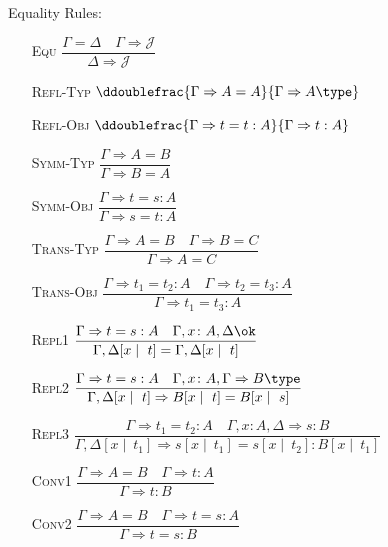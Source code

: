 Equality Rules:
\begin{enumerate}
    \item[\textsc{Equ}] $\dfrac{
        \Gamma = \Delta
        \quad
        \Gamma \Rightarrow \mathcal{J}
    }{
        \Delta \Rightarrow \mathcal{J}
    }$ 
    \item[\textsc{Refl-Typ}] $\ddoublefrac{
        \Gamma \Rightarrow A = A
    }{
        \Gamma \Rightarrow A \type
    }$
    \item[\textsc{Refl-Obj}] $\ddoublefrac{
        \Gamma \Rightarrow t = t : A
    }{
        \Gamma \Rightarrow t : A
    }$
    \item[\textsc{Symm-Typ}] $\dfrac{
        \Gamma \Rightarrow A = B
    }{
        \Gamma \Rightarrow B = A
    }$
    \item[\textsc{Symm-Obj}] $\dfrac{
        \Gamma \Rightarrow t = s : A
    }{
        \Gamma \Rightarrow s = t : A
    }$
    \item[\textsc{Trans-Typ}] $\dfrac{
        \Gamma \Rightarrow A = B 
        \quad
        \Gamma \Rightarrow B = C
    }{
        \Gamma \Rightarrow A = C
    }$
    \item[\textsc{Trans-Obj}] $\dfrac{
        \Gamma \Rightarrow t_1 = t_2 : A 
        \quad
        \Gamma \Rightarrow t_2 = t_3 : A
    }{
        \Gamma \Rightarrow t_1 = t_3 : A
    }$
    \item[\textsc{Repl1}] $\dfrac{
        \Gamma \Rightarrow t = s : A
        \quad
        \Gamma, x \colon A, \Delta \ok
    }{
        \Gamma, \Delta[x \mid\ t] 
        =
        \Gamma, \Delta[x \mid\ t]
    }$
    \item[\textsc{Repl2}] $\dfrac{
        \Gamma \Rightarrow t = s : A
        \quad
        \Gamma, x \colon A, \Gamma \Rightarrow B \type
    }{
        \Gamma, \Delta[x \mid\ t]
        \Rightarrow
        B[x \mid\ t] = B[x \mid\ s]
    }$
    \item[\textsc{Repl3}] $\dfrac{
        \Gamma \Rightarrow t_1 = t_2 : A
        \quad
        \Gamma, x \colon A, \Delta \Rightarrow s : B
    }{
        \Gamma, \Delta[ x \mid\ t_1]
        \Rightarrow
        s[x \mid\ t_1] = s[x \mid\ t_2] : B[x \mid\ t_1]
    }$
    \item[\textsc{Conv1}] $\dfrac{
        \Gamma \Rightarrow A = B
        \quad
        \Gamma \Rightarrow t : A
    }{
        \Gamma \Rightarrow t : B
    }$
    \item[\textsc{Conv2}] $\dfrac{
        \Gamma \Rightarrow A = B
        \quad
        \Gamma \Rightarrow t = s : A
    }{
        \Gamma \Rightarrow t = s : B
    }$
\end{enumerate}

